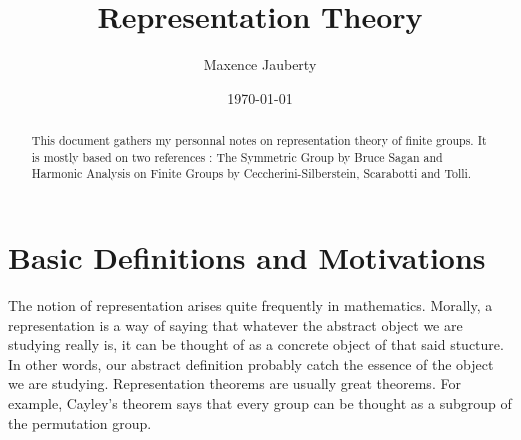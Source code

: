 \documentclass[12pt]{article}
\title{Representation Theory}
\author{Maxence Jauberty}
\date{\today}
\theoremstyle{definition}
\begin{document}
\maketitle
\tableofcontents
\begin{abstract}
    This document gathers my personnal notes on representation theory of finite groups. 
    It is mostly based on two references : The Symmetric Group by Bruce Sagan and Harmonic Analysis on Finite Groups by Ceccherini-Silberstein, Scarabotti and Tolli.
\end{abstract}
\section{Basic Definitions and Motivations}
The notion of representation arises quite frequently in mathematics. Morally, a representation is 
a way of saying that whatever the abstract object we are studying really is, it can be thought of 
as a concrete object of that said stucture. In other words, our abstract definition probably
catch the essence of the object we are studying. Representation theorems are usually great theorems.
For example, Cayley's theorem says that every group can be thought as a subgroup of the permutation group.
\end{document}
